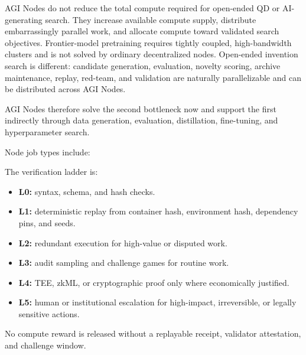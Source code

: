 AGI Nodes do not reduce the total compute required for open-ended QD or
AI-generating search. They increase available compute supply, distribute
embarrassingly parallel work, and allocate compute toward validated
search objectives. Frontier-model pretraining requires tightly coupled,
high-bandwidth clusters and is not solved by ordinary decentralized
nodes. Open-ended invention search is different: candidate generation,
evaluation, novelty scoring, archive maintenance, replay, red-team, and
validation are naturally parallelizable and can be distributed across
AGI Nodes.

AGI Nodes therefore solve the second bottleneck now and support the
first indirectly through data generation, evaluation, distillation,
fine-tuning, and hyperparameter search.

Node job types include:

\begin{Shaded}
\begin{Highlighting}[]
\end{Highlighting}
\end{Shaded}

The verification ladder is:

\begin{itemize}
\tightlist
\item
  \textbf{L0:} syntax, schema, and hash checks.
\item
  \textbf{L1:} deterministic replay from container hash, environment
  hash, dependency pins, and seeds.
\item
  \textbf{L2:} redundant execution for high-value or disputed work.
\item
  \textbf{L3:} audit sampling and challenge games for routine work.
\item
  \textbf{L4:} TEE, zkML, or cryptographic proof only where economically
  justified.
\item
  \textbf{L5:} human or institutional escalation for high-impact,
  irreversible, or legally sensitive actions.
\end{itemize}

No compute reward is released without a replayable receipt, validator
attestation, and challenge window.

